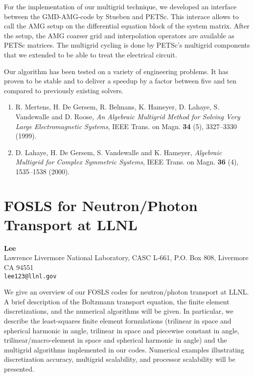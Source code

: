 \documentclass[11pt]{article}
\newcommand{\nextab}[4]{
	\section{#2}
	{\bf #1} \\ \nopagebreak
	{#3} \\ \nopagebreak
	{\tt #4} \nopagebreak
	}
\begin{document}
For the implementation of our multigrid technique, we developed an interface
between the GMD-AMG-code by Stueben and PETSc. This interace allows to call
the AMG setup on the differential equation block of the system matrix. After
the setup, the AMG coarser grid and interpolation operators are available as
PETSc matrices. The multigrid cycling is done by PETSc's multigrid components
that we extended to be able to treat the electrical circuit.


Our algorithm has been tested on a variety of engineering problems. It has
proven to be stable and to deliver a speedup by a factor between five and ten
compared to previously existing solvers.

\begin{enumerate}

\item
R. Mertens, H. De Gersem, R. Belmans, K. Hameyer, D. Lahaye,
S. Vandewalle and D. Roose,
{\em An Algebraic Multigrid Method for Solving Very
Large Electromagnetic Systems},
IEEE Trans. on Magn. {\bf 34} (5), 3327--3330 (1999).

\item
D. Lahaye, H. De Gersem, S. Vandewalle and K. Hameyer,
{\em Algebraic Multigrid for Complex Symmetric Systems},
IEEE Trans. on Magn. {\bf 36} (4), 1535--1538 (2000).

\end{enumerate}




\nextab
{Lee}
{FOSLS for Neutron/Photon Transport at LLNL}
{Lawrence Livermore National Laboratory, CASC L-661, P.O. Box 808, Livermore CA 94551}
{lee123@llnl.gov}


We give an overview of our FOSLS codes for
neutron/photon transport at LLNL. A brief description of the Boltzmann
transport equation, the finite element discretizations, and the
numerical algorithms will be given. In particular, we describe
the least-squares finite element formulations (trilinear in space
and spherical harmonic in angle, trilinear in space and piecewise
constant in angle, trilinear/macro-element in space and spherical
harmonic in angle) and the multigrid algorithms implemented in
our codes. Numerical examples illustrating discretization accuracy,
multigrid scalability, and processor scalability will be presented.


\end{document}
